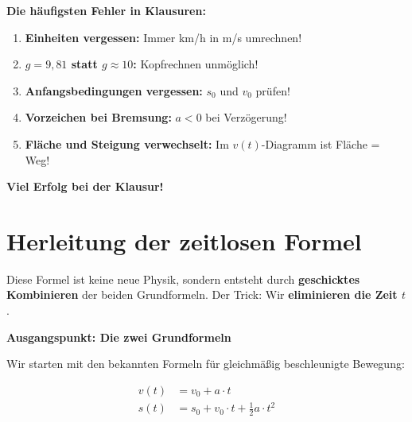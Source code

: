 \documentclass[11pt,a4paper]{article}
\begin{document}
\begin{warnung}
\textbf{Die häufigsten Fehler in Klausuren:}
\begin{enumerate}
\item \textbf{Einheiten vergessen:} Immer km/h in m/s umrechnen!
\item \textbf{$g = 9{,}81$ statt $g \approx 10$:} Kopfrechnen unmöglich!
\item \textbf{Anfangsbedingungen vergessen:} $s_0$ und $v_0$ prüfen!
\item \textbf{Vorzeichen bei Bremsung:} $a < 0$ bei Verzögerung!
\item \textbf{Fläche und Steigung verwechselt:} Im $v(t)$-Diagramm ist Fläche = Weg!
\end{enumerate}
\end{warnung}

\vspace{1cm}

\begin{center}
\large\textbf{Viel Erfolg bei der Klausur!}
\end{center}

\newpage
\appendix
\section{Herleitung der zeitlosen Formel}
\label{sec:herleitung}

\begin{tcolorbox}[colback=physikblue!5, colframe=physikblue, boxrule=1pt, title=\textbf{Für Interessierte: Woher kommt $v^2 = v_0^2 + 2as$?}]
Diese Formel ist keine neue Physik, sondern entsteht durch \textbf{geschicktes Kombinieren} der beiden Grundformeln. Der Trick: Wir \textbf{eliminieren die Zeit $t$}.
\end{tcolorbox}

\vspace{0.5cm}

\textbf{Ausgangspunkt: Die zwei Grundformeln}

Wir starten mit den bekannten Formeln für gleichmäßig beschleunigte Bewegung:

\begin{align}
v(t) &= v_0 + a \cdot t \tag{1: Geschwindigkeit}\\[0.5em]
s(t) &= s_0 + v_0 \cdot t + \frac{1}{2} a \cdot t^2 \tag{2: Weg}
\end{align}
\end{document}
